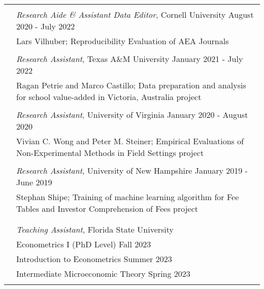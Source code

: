 \documentclass[letterpaper, 11pt]{article}
\begin{document}
\begin{longtable}{p{0.1in}p{5.9in}}




\multicolumn{2}{l}{\color{Maroon}{RESEARCH EXPERIENCE}}\\

& \textit{Research Aide \& Assistant Data Editor}, Cornell University \hfill August 2020 - July 2022 \\
& Lars Vilhuber; Reproducibility Evaluation of AEA Journals \\ 
& \\

& \textit{Research Assistant}, Texas A\&M University \hfill January 2021 - July 2022 \\
& Ragan Petrie and Marco Castillo;  Data preparation and analysis for school value-added in Victoria, Australia project \\ & \\

& \textit{Research Assistant}, University of Virginia \hfill January 2020 - August 2020 \\
& Vivian C. Wong and Peter M. Steiner; Empirical Evaluations of Non-Experimental Methods in Field Settings project \\ & \\

& \textit{Research Assistant}, University of New Hampshire \hfill January 2019 - June 2019 \\
& Stephan Shipe; Training of machine learning algorithm for Fee Tables and Investor Comprehension of Fees project \\ & \\


\multicolumn{2}{l}{\color{Maroon}{TEACHING EXPERIENCE}} \\
& \textit{Teaching Assistant}, Florida State University \\
& \hspace{10pt} Econometrics I (PhD Level) \hfill Fall 2023\\
& \hspace{10pt} Introduction to Econometrics  \hfill Summer 2023\\
& \hspace{10pt} Intermediate Microeconomic Theory  \hfill Spring 2023\\ & \\



\end{longtable}
\end{document}
